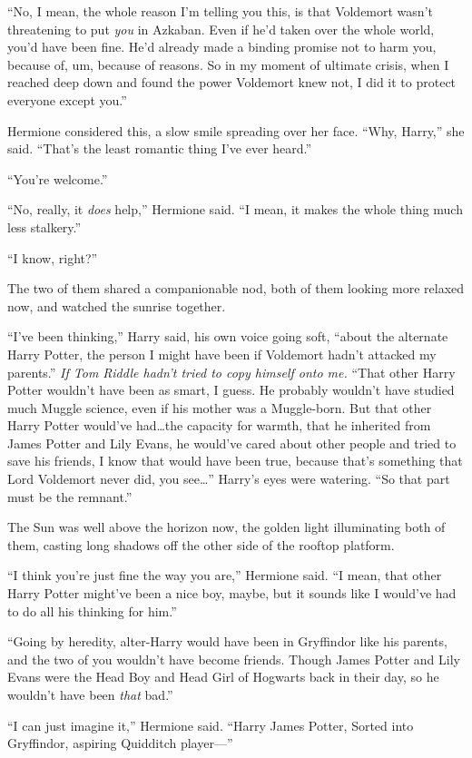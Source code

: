 “No, I mean, the whole reason I’m telling you this, is that Voldemort wasn’t threatening to put \emph{you} in Azkaban. Even if he’d taken over the whole world, you’d have been fine. He’d already made a binding promise not to harm you, because of, um, because of reasons. So in my moment of ultimate crisis, when I reached deep down and found the power Voldemort knew not, I did it to protect everyone except you.”

Hermione considered this, a slow smile spreading over her face. “Why, Harry,” she said. “That’s the least romantic thing I’ve ever heard.”

“You’re welcome.”

“No, really, it \emph{does} help,” Hermione said. “I mean, it makes the whole thing much less stalkery.”

“I know, right?”

The two of them shared a companionable nod, both of them looking more relaxed now, and watched the sunrise together.

“I’ve been thinking,” Harry said, his own voice going soft, “about the alternate Harry Potter, the person I might have been if Voldemort hadn’t attacked my parents.” \emph{If Tom Riddle hadn’t tried to copy himself onto me.} “That other Harry Potter wouldn’t have been as smart, I guess. He probably wouldn’t have studied much Muggle science, even if his mother was a Muggle-born. But that other Harry Potter would’ve had…the capacity for warmth, that he inherited from James Potter and Lily Evans, he would’ve cared about other people and tried to save his friends, I know that would have been true, because that’s something that Lord Voldemort never did, you see…” Harry’s eyes were watering. “So that part must be the remnant.”

The Sun was well above the horizon now, the golden light illuminating both of them, casting long shadows off the other side of the rooftop platform.

“I think you’re just fine the way you are,” Hermione said. “I mean, that other Harry Potter might’ve been a nice boy, maybe, but it sounds like I would’ve had to do all his thinking for him.”

“Going by heredity, alter-Harry would have been in Gryffindor like his parents, and the two of you wouldn’t have become friends. Though James Potter and Lily Evans were the Head Boy and Head Girl of Hogwarts back in their day, so he wouldn’t have been \emph{that} bad.”

“I can just imagine it,” Hermione said. “Harry James Potter, Sorted into Gryffindor, aspiring Quidditch player—”

